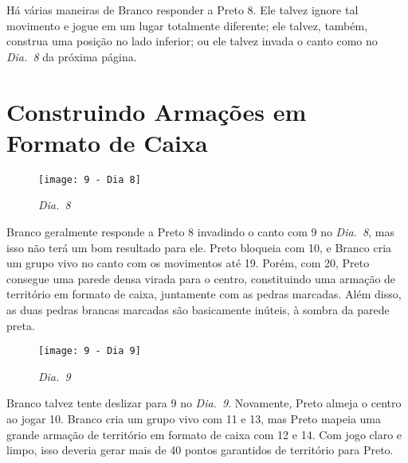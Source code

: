 Há várias maneiras de Branco responder a Preto 8. Ele talvez ignore tal movimento e jogue em um lugar totalmente diferente; ele talvez, também, construa uma posição no lado inferior; ou ele talvez invada o canto como no \emph{Dia.\@~8} da próxima página.

\pagebreak

\section{Construindo Armações em Formato de Caixa}

\begin{wrapfigure}{r}{60mm}
    \vspace{-27.5pt}
    \begin{center}
        \texttt{[image: 9 - Dia 8]}
        \captionsetup{justification=centering}
        \caption*{\emph{Dia.\@~8}}
    \end{center}
    \vspace{-32.5pt}
\end{wrapfigure}

Branco geralmente responde a Preto 8 invadindo o canto com 9 no \emph{Dia.\@~8}, mas isso não terá um bom resultado para ele. Preto bloqueia com 10, e Branco cria um grupo vivo no canto com os movimentos até 19. Porém, com 20, Preto consegue uma parede densa virada para o centro, constituindo uma armação de território em formato de caixa, juntamente com as pedras marcadas. Além disso, as duas pedras brancas marcadas são basicamente inúteis, à sombra da parede preta.

\begin{wrapfigure}{l}{60mm}
    \vspace{-27.5pt}
    \begin{center}
        \texttt{[image: 9 - Dia 9]}
        \captionsetup{justification=centering}
        \caption*{\emph{Dia.\@~9}}
    \end{center}
    \vspace{-80pt}
\end{wrapfigure}

\bigskip

Branco talvez tente deslizar  para 9 no \emph{Dia.\@~9}. Novamente, Preto almeja o centro ao jogar 10. Branco cria um grupo vivo com 11 e 13, mas Preto mapeia uma grande armação de território em formato de caixa com 12 e 14. Com jogo claro e limpo, isso deveria gerar mais de 40 pontos garantidos de território para Preto.

